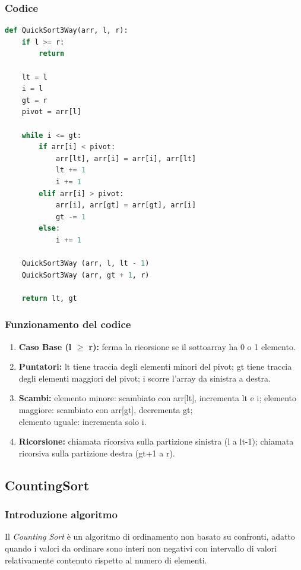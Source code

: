 \documentclass[a4paper, 11pt]{article}
\begin{document}
\subsubsection{Codice}
\begin{lstlisting}[style=mycodestyle, language=Python]
    def QuickSort3Way(arr, l, r):
    if l >= r:
        return

    lt = l
    i = l
    gt = r
    pivot = arr[l]

    while i <= gt:
        if arr[i] < pivot:
            arr[lt], arr[i] = arr[i], arr[lt]
            lt += 1
            i += 1
        elif arr[i] > pivot:
            arr[i], arr[gt] = arr[gt], arr[i]
            gt -= 1
        else:
            i += 1

    QuickSort3Way (arr, l, lt - 1)
    QuickSort3Way (arr, gt + 1, r)

    return lt, gt
\end{lstlisting}

\subsubsection*{Funzionamento del codice}

\begin{enumerate}
  \item \textbf{Caso Base (l $\geq$ r):} ferma la ricorsione se il sottoarray ha 0 o 1 elemento.

  \item \textbf{Puntatori:} lt tiene traccia degli elementi minori del pivot; gt tiene traccia degli elementi maggiori del pivot; i scorre l'array da sinistra a destra.

  \item \textbf{Scambi:} elemento minore: scambiato con arr[lt], incrementa lt e i; elemento maggiore: scambiato con arr[gt], decrementa gt; \\ elemento uguale: incrementa solo i.

  \item \textbf{Ricorsione:} chiamata ricorsiva sulla partizione sinistra (l a lt-1); chiamata ricorsiva sulla partizione destra (gt+1 a r).
\end{enumerate}

\subsection{CountingSort}

\subsubsection*{Introduzione algoritmo}
Il \emph{Counting Sort} è un algoritmo di ordinamento non basato su confronti, adatto quando i valori da ordinare sono interi non negativi con intervallo di valori relativamente contenuto rispetto al numero di elementi. \\
\end{document}

